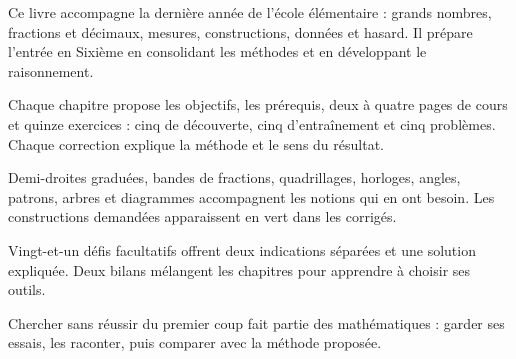\clearpage\thispagestyle{otFront}\label{avant-propos}\fontsize{11}{15}\selectfont

Ce livre accompagne la dernière année de l’école élémentaire : grands
nombres, fractions et décimaux, mesures, constructions, données et hasard.
Il prépare l’entrée en Sixième en consolidant les méthodes et en
développant le raisonnement.\par\medskip
\begin{savoirfaire}Chaque chapitre propose les objectifs,
les prérequis, deux à quatre pages de cours et quinze exercices : cinq
de découverte, cinq d’entraînement et cinq problèmes. Chaque correction
explique la méthode et le sens du résultat.\end{savoirfaire}
\begin{savoirfaire}Demi-droites graduées, bandes
de fractions, quadrillages, horloges, angles, patrons, arbres et diagrammes
accompagnent les notions qui en ont besoin. Les constructions demandées
apparaissent en vert dans les corrigés.\end{savoirfaire}
\begin{savoirfaire}Vingt-et-un défis facultatifs offrent deux
indications séparées et une solution expliquée. Deux bilans mélangent
les chapitres pour apprendre à choisir ses outils.\end{savoirfaire}
Chercher sans réussir du premier coup fait partie des mathématiques :
garder ses essais, les raconter, puis comparer avec la méthode proposée.

\clearpage
